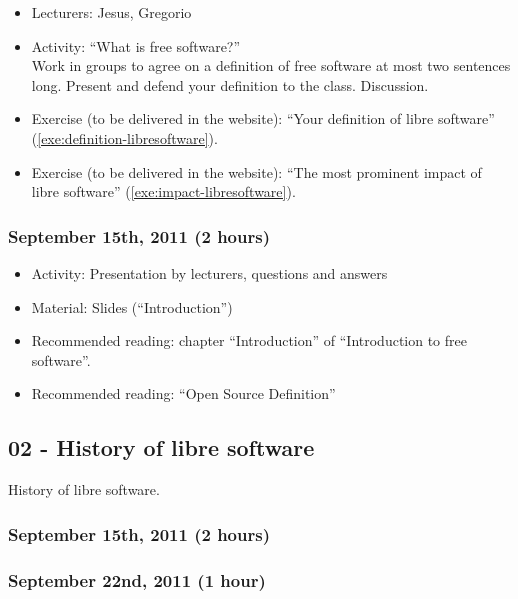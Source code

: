 \documentclass[a4paper]{article}
\begin{document}
\begin{itemize}
\item Lecturers: Jesus, Gregorio
\item Activity: ``What is free software?'' \\
  Work in groups to agree on a definition of free software at most two sentences long. Present and defend your definition to the class. Discussion.
\item Exercise (to be delivered in the website): ``Your definition of libre software'' (\ref{exe:definition-libresoftware}).
\item Exercise (to be delivered in the website): ``The most prominent impact of libre software'' (\ref{exe:impact-libresoftware}).
\end{itemize}

\subsubsection{September 15th, 2011 (2 hours)}

\begin{itemize}
\item Activity: Presentation by lecturers, questions and answers
\item Material: Slides (``Introduction'')
\item Recommended reading: chapter ``Introduction'' of ``Introduction to free software''.
\item Recommended reading: ``Open Source Definition''
\end{itemize}

\subsection{02 - History of libre software}

History of libre software.

\subsubsection{September 15th, 2011 (2 hours)}

\subsubsection{September 22nd, 2011 (1 hour)}
\end{document}
